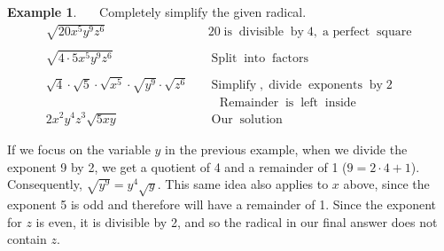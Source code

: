\documentclass[12pt]{book}
\theoremstyle{definition}
\newtheorem{example}{Example}
\newcommand{\tmop}[1]{\ensuremath{\operatorname{#1}}}
\begin{document}
\begin{example}~~~Completely simplify the given radical.
  \begin{eqnarray*}
    \sqrt{20 x^5 y^9 z^6} &  & 20 \tmop{is} \tmop{divisible} \tmop{by} 4, \tmop{a~perfect} \tmop{square}\\
    & & \\
		\sqrt{4 \cdot 5 x^5 y^9 z^6} &  & \tmop{Split} \tmop{into}
    \tmop{factors}\\
    & & \\
		\sqrt{4} \cdot \sqrt{5} \cdot \sqrt{x^5} \cdot \sqrt{y^9} \cdot \sqrt{z^6}
    &  & \tmop{Simplify}, \tmop{divide} \tmop{exponents} \tmop{by} 2\\
    & & ~~~\tmop{Remainder} \tmop{is} \tmop{left} \tmop{inside}\\
    2 x^2 y^4 z^3 \sqrt{5 x y} &  & \tmop{Our} \tmop{solution}
  \end{eqnarray*}
\end{example}
If we focus on the variable $y$ in the previous example, when we divide the exponent 9 by 2, we get a quotient of 4 and a remainder of 1 ($9=2\cdot 4+1$).  Consequently, $\sqrt{y^9}=y^4\sqrt{y}$. This same idea also applies to $x$ above, since the exponent 5 is odd and therefore will have a remainder of 1.  Since the exponent for $z$ is even, it is divisible by 2, and so the radical in our final answer does not contain $z$.
\end{document}
